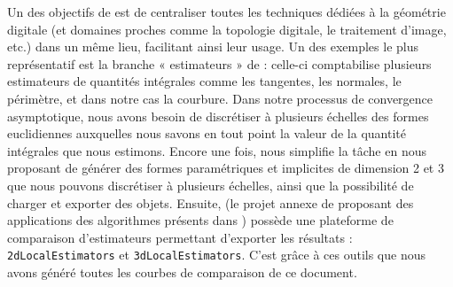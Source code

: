 Un des objectifs de \DGtal est de centraliser toutes les techniques dédiées à la
géométrie digitale (et domaines proches comme la topologie digitale, le
traitement d'image, etc.) dans un même lieu, facilitant ainsi leur usage. Un des
exemples le plus représentatif est la branche « estimateurs » de \DGtal :
celle-ci comptabilise plusieurs estimateurs de quantités intégrales comme
les tangentes, les normales, le périmètre, et dans notre cas la courbure. Dans
notre processus de convergence asymptotique, nous avons besoin de discrétiser à
plusieurs échelles des formes euclidiennes auxquelles nous savons en tout point
la valeur de la quantité intégrales que nous estimons. Encore une fois,
\DGtal nous simplifie la tâche en nous proposant de générer des formes
paramétriques et implicites de dimension 2 et 3 que nous pouvons discrétiser à
plusieurs échelles, ainsi que la possibilité de charger et exporter des objets.
Ensuite, \DGtalTools (le projet annexe de \DGtal proposant des applications des
algorithmes présents dans \DGtal) possède une plateforme de comparaison
d'estimateurs permettant d'exporter les résultats : \texttt{2dLocalEstimators}
et \texttt{3dLocalEstimators}. C'est grâce à ces outils que nous avons généré
toutes les courbes de comparaison de ce document.

